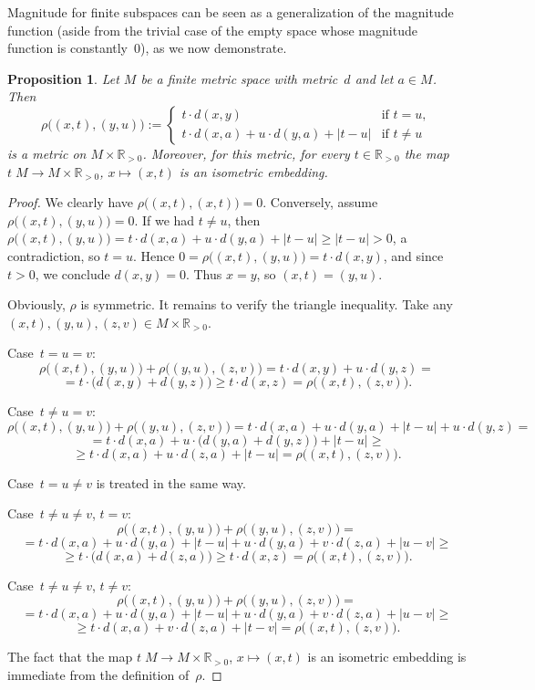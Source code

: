\documentclass[11pt]{article}
\theoremstyle{plain}
\newtheorem{proposition}[theorem]{Proposition}
\theoremstyle{definition}
\newcommand{\RR}{\mathbb{R}}
\begin{document}
Magnitude for finite subspaces can be seen as a generalization of the magnitude function (aside from the trivial case of the empty space whose magnitude function is constantly~$0$), as we now demonstrate.

\begin{proposition}
Let $M$ be a finite metric space with metric~$d$ and let $a \in M$. Then
\[\rho\big((x, t), (y, u)\big) := \begin{cases} t \cdot d(x, y) & \text{if $t = u$}, \\ t \cdot d(x, a) + u \cdot d(y, a) + |t - u| & \text{if $t \neq u$} \end{cases}\]
is a metric on $M \times \RR_{> 0}$. Moreover, for this metric, for every $t \in \RR_{> 0}$ the map $t\;\!M \to M \times \RR_{> 0}$, $x \mapsto (x, t)$ is an isometric embedding.
\end{proposition}

\begin{proof}
We clearly have $\rho\big((x, t), (x, t)\big) = 0$. Conversely, assume $\rho\big((x, t), (y, u)\big) = 0$. If we had $t \neq u$, then $\rho\big((x, t), (y, u)\big) = t \cdot d(x, a) + u \cdot d(y, a) + |t - u| \geq |t - u| > 0$, a contradiction, so $t = u$. Hence $0 = \rho\big((x, t), (y, u)\big) = t \cdot d(x, y)$, and since $t > 0$, we conclude $d(x, y) = 0$. Thus $x = y$, so $(x, t) = (y, u)$.

Obviously, $\rho$ is symmetric. It remains to verify the triangle inequality. Take any $(x, t), (y, u), (z, v) \in M \times \RR_{> 0}$.

Case~$t = u = v$:
\[\rho\big((x, t), (y, u)\big) + \rho\big((y, u), (z, v)\big) = t \cdot d(x, y) + u \cdot d(y, z) =\]
\[= t \cdot \big(d(x, y) + d(y, z)\big) \geq t \cdot d(x, z) = \rho\big((x, t), (z, v)\big).\]

Case~$t \neq u = v$:
\[\rho\big((x, t), (y, u)\big) + \rho\big((y, u), (z, v)\big) = t \cdot d(x, a) + u \cdot d(y, a) + |t - u| + u \cdot d(y, z) =\]
\[= t \cdot d(x, a) + u \cdot \big(d(y, a) + d(y, z)\big) + |t - u| \geq\]
\[\geq t \cdot d(x, a) + u \cdot d(z, a) + |t - u| = \rho\big((x, t), (z, v)\big).\]

Case~$t = u \neq v$ is treated in the same way.

Case~$t \neq u \neq v$, $t = v$:
\[\rho\big((x, t), (y, u)\big) + \rho\big((y, u), (z, v)\big) =\]
\[= t \cdot d(x, a) + u \cdot d(y, a) + |t - u| + u \cdot d(y, a) + v \cdot d(z, a) + |u - v| \geq\]
\[\geq t \cdot \big(d(x, a) + d(z, a)\big) \geq t \cdot d(x, z) = \rho\big((x, t), (z, v)\big).\]

Case~$t \neq u \neq v$, $t \neq v$:
\[\rho\big((x, t), (y, u)\big) + \rho\big((y, u), (z, v)\big) =\]
\[= t \cdot d(x, a) + u \cdot d(y, a) + |t - u| + u \cdot d(y, a) + v \cdot d(z, a) + |u - v| \geq\]
\[\geq t \cdot d(x, a) + v \cdot d(z, a) + |t - v| = \rho\big((x, t), (z, v)\big).\]

The fact that the map $t\;\!M \to M \times \RR_{> 0}$, $x \mapsto (x, t)$ is an isometric embedding is immediate from the definition of~$\rho$.
\end{proof}
\end{document}
